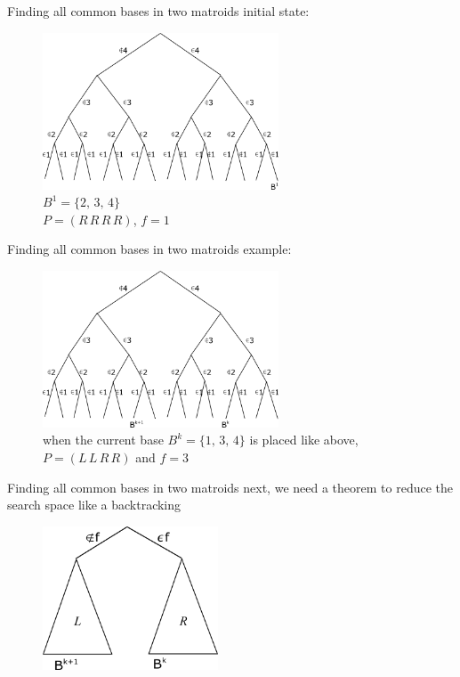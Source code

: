 \documentclass[11pt,xcolor=dvipsnames,table,dvipdfmx]{beamer}
\begin{document}
\begin{frame}{Finding all common bases in two matroids}
 initial state:
 \begin{figure}
  \centering
  \includegraphics[width=7cm]{text4989-9.png}\vspace{0.3cm}\\
  $B^1 = \{2,\,3,\,4\}$\\
  $P = (R\,R\,R\,R)$, $f = 1$ 
 \end{figure}
\end{frame}

\begin{frame}{Finding all common bases in two matroids}
 example:
 \begin{figure}
  \centering
  \includegraphics[width=7cm]{text4989-10.png}\vspace{0.3cm}\\
  when the current base $B^k = \{1,\,3,\,4\}$ is placed like above,\\
  $P = (L\,L\,R\,R)$ and $f = 3$ 
 \end{figure}
\end{frame}

\begin{frame}{Finding all common bases in two matroids}
 next, we need a theorem to reduce the search space like a backtracking
 \begin{figure}
  \centering
  \includegraphics[width=5.2cm]{text4989-7.png}
 \end{figure}
\end{frame}
\end{document}
